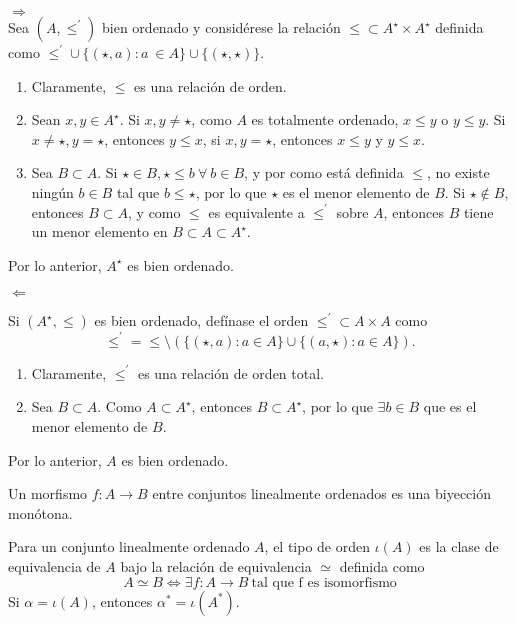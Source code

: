 \begin{sol}
    $\Rightarrow$\\
    Sea $(A,\leq^{\prime})$ bien ordenado y considérese la relación $\leq\subset A^\star\times A^\star$ definida como $\leq^{\prime} \cup \{(\star,a):a \ \in A\}\cup \{(\star,\star)\}$. 
    \begin{enumerate}
        \item Claramente, $\leq$ es una relación de orden.
        \item Sean $x,y\in A^\star$. Si $x,y \neq \star$, como $A$ es totalmente ordenado, $x\leq y$ o $y\leq y$. Si $x\neq \star, y=\star$, entonces $y\leq x$,  si $x,y=\star$, entonces $x\leq y $ y $y\leq x$.
        \item Sea $B\subset A$. Si $\star\in B, \star\leq b \ \forall \ b\in B$, y por como está definida $\leq$, no existe ningún $b\in B$ tal que $b\leq \star$, por lo que $\star$ es el menor elemento de $B$.
        Si $\star\not\in B$, entonces $B\subset A$, y como $\leq$ es equivalente a $\leq^{\prime}$ sobre $A$, entonces $B$ tiene un menor elemento en $B\subset A \subset A^\star$.
    \end{enumerate}
    Por lo anterior, $A^\star$ es bien ordenado.\vspace{3mm}
    
    $\Leftarrow$\vspace{3mm}
    
    Si $(A^\star,\leq)$ es bien ordenado, defínase el orden $\leq^{\prime}\subset A\times A$ como
    \[
        \leq^{\prime}=\leq\setminus \left( \{(\star,a):a\in A\} \cup \{(a,\star):a\in A\}\right)
    .\]
    \begin{enumerate}
        \item Claramente, $\leq^{\prime} $ es una relación de orden total.
        \item Sea $B\subset A$. Como $A\subset A^\star$, entonces $B\subset A^\star$, por lo que $\exists b\in B$ que es el menor elemento de $B$.
    \end{enumerate}
    Por lo anterior, $A$ es bien ordenado.
\end{sol}
\begin{defn}
Un morfismo $f:A\to B$ entre conjuntos linealmente ordenados es una biyección monótona.
\end{defn}
\begin{defn}
  Para un conjunto linealmente ordenado $A$, el tipo de orden $\iota(A)$ es la clase de equivalencia de $A$ bajo la relación de equivalencia $\simeq$ definida como
  $$A\simeq B \iff \exists f: A\to B \ \text{tal que f es isomorfismo}$$
  Si $\alpha=\iota(A)$, entonces $\alpha^*=\iota(A^*)$.
\end{defn}
